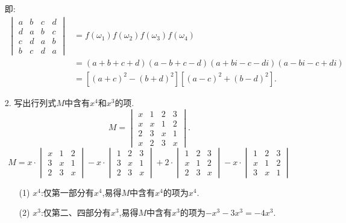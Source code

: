 \documentclass{article}
\begin{document}
\begin{enumerate}
    即:
    \begin{align*}
        \begin{vmatrix}
            a & b & c & d\\
            d & a & b & c\\
            c & d & a & b\\
            b & c & d & a
        \end{vmatrix}
        &=f(\omega_1) f(\omega_2) f(\omega_3) f(\omega_4)\\
        &=(a+b+c+d)(a-b+c-d)(a+bi-c-di)(a-bi-c+di)\\
        &=[{(a+c)}^2-{(b+d)}^2][{(a-c)}^2+{(b-d)}^2].
    \end{align*}
    \item [2.]写出行列式$M$中含有$x^4$和$x^3$的项.
    \[
        M=
        \begin{vmatrix}
            x & 1 & 2 & 3\\
            x & x & 1 & 2\\
            2 & 3 & x & 1\\
            x & 2 & 3 & x
        \end{vmatrix}.
    \]
    \[
        M=
        x\cdot
        \begin{vmatrix}
            x & 1 & 2\\
            3 & x & 1\\
            2 & 3 & x
        \end{vmatrix} 
        -x\cdot
        \begin{vmatrix}
            1 & 2 & 3\\
            3 & x & 1\\
            2 & 3 & x
        \end{vmatrix} 
        +2\cdot
        \begin{vmatrix}
            1 & 2 & 3\\
            x & 1 & 2\\
            2 & 3 & x
        \end{vmatrix} 
        -x\cdot
        \begin{vmatrix}
            1 & 2 & 3\\
            x & 1 & 2\\
            3 & x & 1
        \end{vmatrix}
    \]
    \begin{enumerate}       
        \item [(1)]$x^4$:仅第一部分有$x^4$,易得$M$中含有$x^4$的项为$x^4$.
        \item [(2)]$x^3$:仅第二、四部分有$x^3$,易得$M$中含有$x^3$的项为$-x^3-3x^3=-4x^3$.

\end{enumerate}
\end{enumerate}
\end{document}
